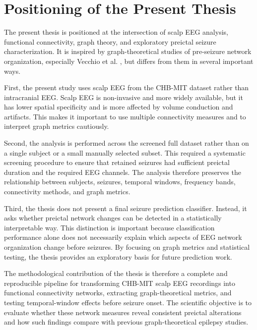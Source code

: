 \section{Positioning of the Present Thesis}
\label{sec:background-positioning}

The present thesis is positioned at the intersection of scalp EEG analysis,
functional connectivity, graph theory, and exploratory preictal seizure
characterization. It is inspired by graph-theoretical studies of pre-seizure
network organization, especially Vecchio et al. \cite{Vecchio2016}, but differs
from them in several important ways.

First, the present study uses scalp EEG from the CHB-MIT dataset rather than
intracranial EEG. Scalp EEG is non-invasive and more widely available, but it
has lower spatial specificity and is more affected by volume conduction and
artifacts. This makes it important to use multiple connectivity measures and to
interpret graph metrics cautiously.

Second, the analysis is performed across the screened full dataset rather than
on a single subject or a small manually selected subset. This required a
systematic screening procedure to ensure that retained seizures had sufficient
preictal duration and the required EEG channels. The analysis therefore
preserves the relationship between subjects, seizures, temporal windows,
frequency bands, connectivity methods, and graph metrics.

Third, the thesis does not present a final seizure prediction classifier.
Instead, it asks whether preictal network changes can be detected in a
statistically interpretable way. This distinction is important because
classification performance alone does not necessarily explain which aspects of
EEG network organization change before seizures. By focusing on graph metrics
and statistical testing, the thesis provides an exploratory basis for future
prediction work.

The methodological contribution of the thesis is therefore a complete and
reproducible pipeline for transforming CHB-MIT scalp EEG recordings into
functional connectivity networks, extracting graph-theoretical metrics, and
testing temporal-window effects before seizure onset. The scientific objective
is to evaluate whether these network measures reveal consistent preictal
alterations and how such findings compare with previous graph-theoretical
epilepsy studies.